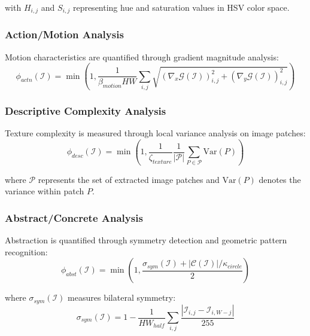 \documentclass[11pt,a4paper]{article}
\begin{document}
with $H_{i,j}$ and $S_{i,j}$ representing hue and saturation values in HSV color space.

\subsubsection{Action/Motion Analysis}

Motion characteristics are quantified through gradient magnitude analysis:
\begin{equation}
\phi_{actn}(\mathcal{I}) = \min\left(1, \frac{1}{\beta_{motion}HW} \sum_{i,j} \sqrt{(\nabla_x \mathcal{G}(\mathcal{I}))_{i,j}^2 + (\nabla_y \mathcal{G}(\mathcal{I}))_{i,j}^2}\right)
\label{eq:action-measure}
\end{equation}

\subsubsection{Descriptive Complexity Analysis}

Texture complexity is measured through local variance analysis on image patches:
\begin{equation}
\phi_{desc}(\mathcal{I}) = \min\left(1, \frac{1}{\zeta_{texture}} \frac{1}{|\mathcal{P}|} \sum_{P \in \mathcal{P}} \text{Var}(P)\right)
\label{eq:descriptive-measure}
\end{equation}

where $\mathcal{P}$ represents the set of extracted image patches and $\text{Var}(P)$ denotes the variance within patch $P$.

\subsubsection{Abstract/Concrete Analysis}

Abstraction is quantified through symmetry detection and geometric pattern recognition:
\begin{equation}
\phi_{abst}(\mathcal{I}) = \min\left(1, \frac{\sigma_{sym}(\mathcal{I}) + |\mathcal{C}(\mathcal{I})|/\kappa_{circle}}{2}\right)
\label{eq:abstract-measure}
\end{equation}

where $\sigma_{sym}(\mathcal{I})$ measures bilateral symmetry:
\begin{equation}
\sigma_{sym}(\mathcal{I}) = 1 - \frac{1}{HW_{half}} \sum_{i,j} \frac{|\mathcal{I}_{i,j} - \mathcal{I}_{i,W-j}|}{255}
\label{eq:symmetry-measure}
\end{equation}
\end{document}
